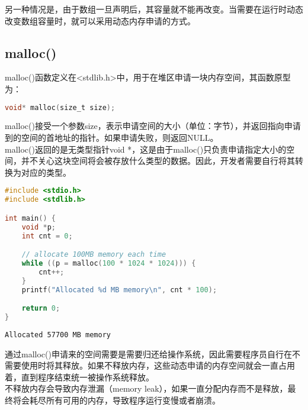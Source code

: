 另一种情况是，由于数组一旦声明后，其容量就不能再改变。当需要在运行时动态改变数组容量时，就可以采用动态内存申请的方式。\\

\subsection{malloc()}

malloc()函数定义在<stdlib.h>中，用于在堆区申请一块内存空间，其函数原型为：

\vspace{-0.5cm}

\begin{lstlisting}[language=C]
void* malloc(size_t size);
\end{lstlisting}

malloc()接受一个参数size，表示申请空间的大小（单位：字节），并返回指向申请到的空间的首地址的指针。如果申请失败，则返回NULL。\\

malloc()返回的是无类型指针void *，这是由于malloc()只负责申请指定大小的空间，并不关心这块空间将会被存放什么类型的数据。因此，开发者需要自行将其转换为对应的类型。\\


\begin{lstlisting}[language=C]
#include <stdio.h>
#include <stdlib.h>

int main() {
    void *p;
    int cnt = 0;

    // allocate 100MB memory each time
    while ((p = malloc(100 * 1024 * 1024))) {
        cnt++;
    }
    printf("Allocated %d MB memory\n", cnt * 100);

    return 0;
}
\end{lstlisting}

\begin{tcolorbox}
    \begin{verbatim}
Allocated 57700 MB memory
	\end{verbatim}
\end{tcolorbox}

通过malloc()申请来的空间需要是需要归还给操作系统，因此需要程序员自行在不需要使用时将其释放。如果不释放内存，这些动态申请的内存空间就会一直占用着，直到程序结束统一被操作系统释放。\\

不释放内存会导致内存泄漏（memory leak），如果一直分配内存而不是释放，最终将会耗尽所有可用的内存，导致程序运行变慢或者崩溃。\\

